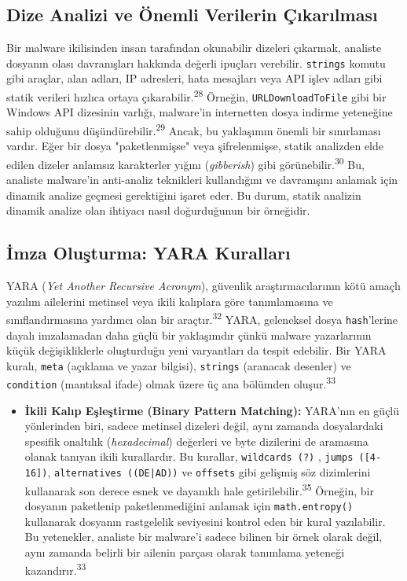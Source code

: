 \subsection{Dize Analizi ve Önemli Verilerin Çıkarılması}

Bir malware ikilisinden insan tarafından okunabilir dizeleri çıkarmak, analiste dosyanın olası davranışları hakkında değerli ipuçları verebilir. \texttt{strings} komutu gibi araçlar, alan adları, IP adresleri, hata mesajları veya API işlev adları gibi statik verileri hızlıca ortaya çıkarabilir.\textsuperscript{28} Örneğin, \texttt{URLDownloadToFile} gibi bir Windows API dizesinin varlığı, malware'in internetten dosya indirme yeteneğine sahip olduğunu düşündürebilir.\textsuperscript{29} Ancak, bu yaklaşımın önemli bir sınırlaması vardır. Eğer bir dosya "paketlenmişse" veya şifrelenmişse, statik analizden elde edilen dizeler anlamsız karakterler yığını (\textit{gibberish}) gibi görünebilir.\textsuperscript{30} Bu, analiste malware'in anti-analiz teknikleri kullandığını ve davranışını anlamak için dinamik analize geçmesi gerektiğini işaret eder. Bu durum, statik analizin dinamik analize olan ihtiyacı nasıl doğurduğunun bir örneğidir.

\subsection{İmza Oluşturma: YARA Kuralları}

YARA (\textit{Yet Another Recursive Acronym}), güvenlik araştırmacılarının kötü amaçlı yazılım ailelerini metinsel veya ikili kalıplara göre tanımlamasına ve sınıflandırmasına yardımcı olan bir araçtır.\textsuperscript{32} YARA, geleneksel dosya \texttt{hash}'lerine dayalı imzalamadan daha güçlü bir yaklaşımdır çünkü malware yazarlarının küçük değişikliklerle oluşturduğu yeni varyantları da tespit edebilir. Bir YARA kuralı, \texttt{meta} (açıklama ve yazar bilgisi), \texttt{strings} (aranacak desenler) ve \texttt{condition} (mantıksal ifade) olmak üzere üç ana bölümden oluşur.\textsuperscript{33}

\begin{itemize}
    \item \textbf{İkili Kalıp Eşleştirme (Binary Pattern Matching):} YARA'nın en güçlü yönlerinden biri, sadece metinsel dizeleri değil, aynı zamanda dosyalardaki spesifik onaltılık (\textit{hexadecimal}) değerleri ve byte dizilerini de aramasına olanak tanıyan ikili kurallardır. Bu kurallar, \texttt{wildcards (?)} , \texttt{jumps ([4-16])}, \texttt{alternatives ((DE|AD))} ve \texttt{offsets} gibi gelişmiş söz dizimlerini kullanarak son derece esnek ve dayanıklı hale getirilebilir.\textsuperscript{35} Örneğin, bir dosyanın paketlenip paketlenmediğini anlamak için \texttt{math.entropy()} kullanarak dosyanın rastgelelik seviyesini kontrol eden bir kural yazılabilir. Bu yetenekler, analiste bir malware'i sadece bilinen bir örnek olarak değil, aynı zamanda belirli bir ailenin parçası olarak tanımlama yeteneği kazandırır.\textsuperscript{33}
\end{itemize}

